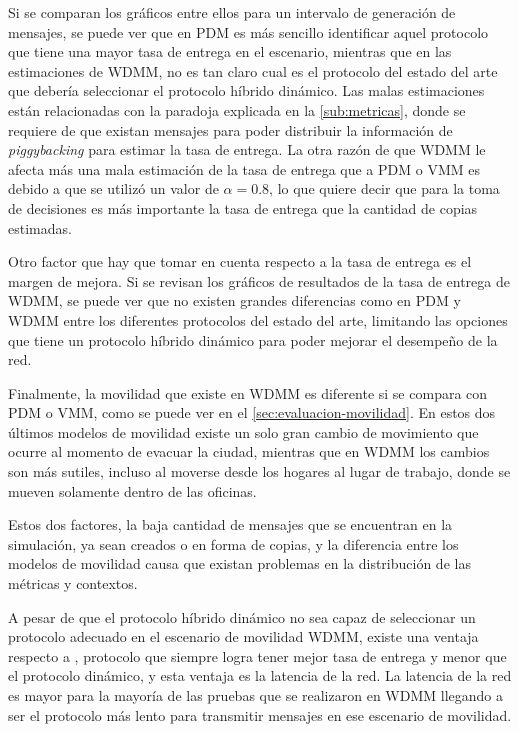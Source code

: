 Si se comparan los gráficos entre ellos para un intervalo de generación de
mensajes, se puede ver que en PDM es más sencillo identificar aquel protocolo
que tiene una mayor tasa de entrega en el escenario, mientras que en las
estimaciones de WDMM, no es tan claro cual es el protocolo del estado del arte
que debería seleccionar el protocolo híbrido dinámico. Las malas estimaciones
están relacionadas con la paradoja explicada en la \ref{sub:metricas}, donde se
requiere de que existan mensajes para poder distribuir la información de 
\textit{piggybacking} para estimar la tasa de entrega. La otra razón de que WDMM
le afecta más una mala estimación de la tasa de entrega que a PDM o VMM es
debido a que se utilizó un valor de $\alpha = 0.8$, lo que quiere decir que para
la toma de decisiones es más importante la tasa de entrega que la cantidad de
copias estimadas.

Otro factor que hay que tomar en cuenta respecto a la tasa de entrega es el
margen de mejora. Si se revisan los gráficos de resultados de la tasa de entrega
de WDMM, se puede ver que no existen grandes diferencias como en PDM y WDMM
entre los diferentes protocolos del estado del arte, limitando las opciones que
tiene un protocolo híbrido dinámico para poder mejorar el desempeño de la red.

Finalmente, la movilidad que existe en WDMM es diferente si se compara con PDM o
VMM, como se puede ver en el \ref{sec:evaluacion-movilidad}. En estos dos
últimos modelos de movilidad existe un solo gran cambio de movimiento que ocurre
al momento de evacuar la ciudad, mientras que en WDMM los cambios son más
sutiles, incluso al moverse desde los hogares al lugar de trabajo, donde se
mueven solamente dentro de las oficinas.  

Estos dos factores, la baja cantidad de mensajes que se encuentran en la
simulación, ya sean creados o en forma de copias, y la diferencia entre los
modelos de movilidad causa que existan problemas en la distribución de las
métricas y contextos.

A pesar de que el protocolo híbrido dinámico no sea capaz de seleccionar un
protocolo adecuado en el escenario de movilidad WDMM, existe una ventaja
respecto a \syf, protocolo que siempre logra tener mejor tasa de entrega y menor
\overhead{} que el protocolo dinámico, y esta ventaja es la latencia de la red.
La latencia de la red es mayor para la mayoría de las pruebas que se realizaron
en WDMM llegando a ser el protocolo más lento para transmitir mensajes en ese
escenario de movilidad.


